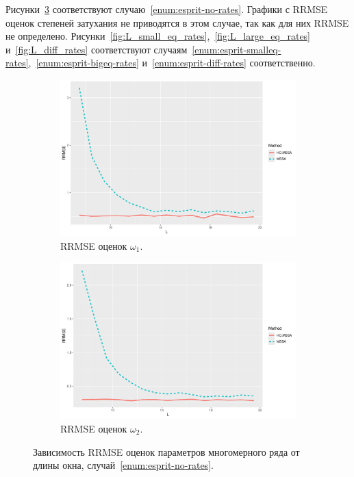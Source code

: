 \documentclass[specialist,
  substylefile=spbu.rtx,
subf,href,colorlinks=true, 12pt]{disser}
\theoremstyle{plain}
\theoremstyle{definition}
\theoremstyle{remark}
\begin{document}
Рисунки~\ref{fig:L_no_rates} соответствуют случаю~\ref{enum:esprit-no-rates}.
Графики с RRMSE оценок степеней затухания не приводятся в этом случае, так как для них RRMSE не определено.
Рисунки~\ref{fig:L_small_eq_rates},~\ref{fig:L_large_eq_rates} и~\ref{fig:L_diff_rates}
соответствуют случаям~\ref{enum:esprit-smalleq-rates},~\ref{enum:esprit-bigeq-rates} и~\ref{enum:esprit-diff-rates}
соответственно.
\begin{figure}[!ht]
  \centering
  \begin{subfigure}{0.49\linewidth}
    \includegraphics[width=\linewidth]{freq1_L_no_rates.pdf}
    \caption{RRMSE оценок $\omega_1$.}
    \label{fig:freq1_L_no_rates}
  \end{subfigure}
  \begin{subfigure}{0.49\linewidth}
    \includegraphics[width=\linewidth]{freq2_L_no_rates.pdf}
    \caption{RRMSE оценок $\omega_2$.}
    \label{fig:freq2_L_no_rates}
  \end{subfigure}
  \caption{Зависимость RRMSE оценок параметров многомерного ряда от длины окна,
  случай~\ref{enum:esprit-no-rates}.}
  \label{fig:L_no_rates}
\end{figure}
\end{document}
